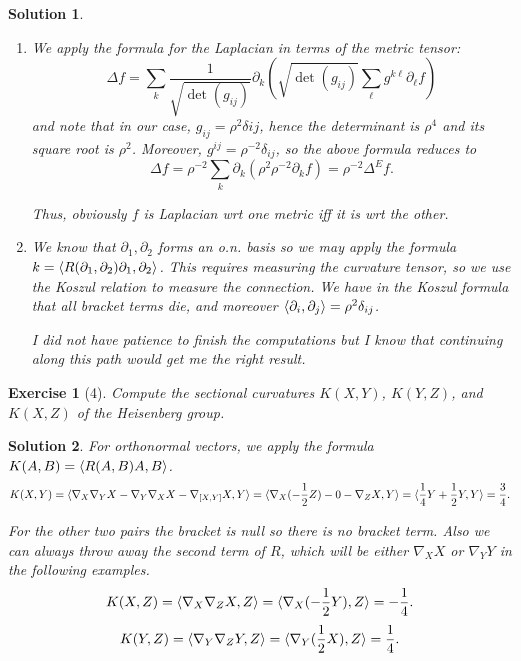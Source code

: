 \documentclass{article}
\theoremstyle{plain}
\newtheorem*{ex}{Exercise}
\theoremstyle{nonumberplain}
\newtheorem{sol}{Solution}
\DeclarePairedDelimiter{\braket}{\langle}{\rangle}
\begin{document}
\begin{sol}
\leavevmode
\begin{enumerate}
\item We apply the formula for the Laplacian in terms of the metric tensor:
\begin{equation}
\Delta f = \sum_k \frac1{\sqrt{\det(g_{ij})}} \partial_k \left( \sqrt{\det(g_{ij})} \sum_\ell g^{k \ell} \partial_\ell f \right)
\end{equation}
and note that in our case, $g_{ij} = \rho^2 \delta{ij}$, hence the determinant is $\rho^4$ and its square root is $\rho^2$. Moreover, $g^{ij} = \rho^{-2} \delta_{ij}$, so the above formula reduces to
\begin{equation}
\Delta f = \rho^{-2} \sum_k \partial_k \left( \rho^2 \rho^{-2} \partial_k f\right) = \rho^{-2} \Delta^E f.
\end{equation}

Thus, obviously $f$ is Laplacian wrt one metric iff it is wrt the other.

\item We know that $\partial_1, \partial_2$ forms an o.n. basis so we may apply the formula $k = \braket{R(\partial_1, \partial_2) \partial_1, \partial_2}$. This requires measuring the curvature tensor, so we use the Koszul relation to measure the connection. We have in the Koszul formula that all bracket terms die, and moreover $\braket{\partial_i, \partial_j} = \rho^2 \delta_{ij}$.

I did not have patience to finish the computations but I know that continuing along this path would get me the right result.
\end{enumerate}
\end{sol}

\begin{ex}[4]
Compute the sectional curvatures $K(X,Y)$, $K(Y,Z)$, and $K(X,Z)$ of the Heisenberg group.
\end{ex}

\begin{sol}
For orthonormal vectors, we apply the formula $K(A,B) = \braket{R(A,B)A, B}$.
\begin{equation}
K(X,Y) = \braket{\nabla_X \nabla_Y X - \nabla_Y \nabla_X X - \nabla_{[X,Y]} X, Y} = \braket{\nabla_X (-\frac12 Z) - 0 - \nabla_Z X, Y} = \braket{\frac14 Y + \frac12 Y, Y} = \frac34.
\end{equation}

For the other two pairs the bracket is null so there is no bracket term. Also we can always throw away the second term of $R$, which will be either $\nabla_X X$ or $\nabla_Y Y$ in the following examples.
\begin{equation}
K(X,Z) = \braket{\nabla_X \nabla_Z X, Z} = \braket{\nabla_X (-\frac12 Y), Z} = - \frac14.
\end{equation}
\begin{equation}
K(Y,Z) = \braket{\nabla_Y \nabla_Z Y, Z} = \braket{\nabla_Y (\frac12 X), Z} = \frac14.
\end{equation}
\end{sol}
\end{document}
